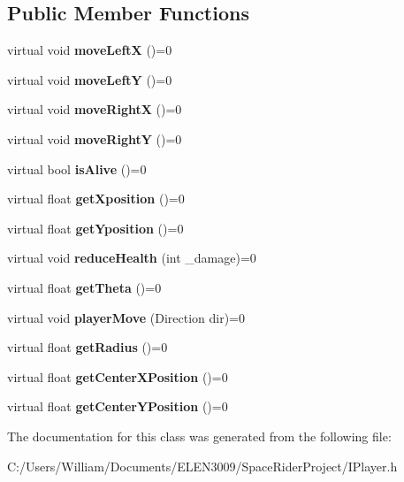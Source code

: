 \subsection*{Public Member Functions}
\begin{DoxyCompactItemize}
\item 
\mbox{\label{class_i_player_a46d098eef1da625e555852341ced76c9}} 
virtual void {\bfseries move\+LeftX} ()=0
\item 
\mbox{\label{class_i_player_ab4a195d99869ef7628e923e433fc8264}} 
virtual void {\bfseries move\+LeftY} ()=0
\item 
\mbox{\label{class_i_player_a59f3be9939ee5406cb215845b6cf00c4}} 
virtual void {\bfseries move\+RightX} ()=0
\item 
\mbox{\label{class_i_player_ae0c49a2900ebbfa951f24bc1bf4bb382}} 
virtual void {\bfseries move\+RightY} ()=0
\item 
\mbox{\label{class_i_player_a5b417cd92b4463e1c296a627430282b6}} 
virtual bool {\bfseries is\+Alive} ()=0
\item 
\mbox{\label{class_i_player_a9df96a1fd43f35f2579e2ec4a167acfe}} 
virtual float {\bfseries get\+Xposition} ()=0
\item 
\mbox{\label{class_i_player_af72407abf2418dd9c1df50f29d51f0ef}} 
virtual float {\bfseries get\+Yposition} ()=0
\item 
\mbox{\label{class_i_player_a27eab471444f8ae2cf96bee562488b70}} 
virtual void {\bfseries reduce\+Health} (int \+\_\+damage)=0
\item 
\mbox{\label{class_i_player_a05103e6bebfd4230bab62d112c7e4eec}} 
virtual float {\bfseries get\+Theta} ()=0
\item 
\mbox{\label{class_i_player_a39685438043898f69bcf62c81b60e7b9}} 
virtual void {\bfseries player\+Move} (Direction dir)=0
\item 
\mbox{\label{class_i_player_a240460b3baeee74029f1fc407493d121}} 
virtual float {\bfseries get\+Radius} ()=0
\item 
\mbox{\label{class_i_player_a10d652f5066f96f3526242448de3a6e2}} 
virtual float {\bfseries get\+Center\+X\+Position} ()=0
\item 
\mbox{\label{class_i_player_a6c5a2ec396245f91bee3e00ab089d57e}} 
virtual float {\bfseries get\+Center\+Y\+Position} ()=0
\end{DoxyCompactItemize}


The documentation for this class was generated from the following file\+:\begin{DoxyCompactItemize}
\item 
C\+:/\+Users/\+William/\+Documents/\+E\+L\+E\+N3009/\+Space\+Rider\+Project/I\+Player.\+h\end{DoxyCompactItemize}
